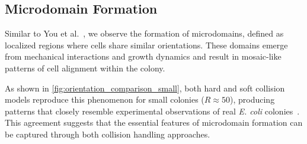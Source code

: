 \documentclass[conference]{IEEEtran}
\begin{document}
\subsection{Microdomain Formation}
\label{sec:microdomain_formation}

Similar to You et al.~\cite{You2018,You_2021}, we observe the formation of microdomains, defined as localized regions where cells share similar orientations. These domains emerge from mechanical interactions and growth dynamics and result in mosaic-like patterns of cell alignment within the colony.

As shown in \autoref{fig:orientation_comparison_small}, both hard and soft collision models reproduce this phenomenon for small colonies ($R \approx 50$), producing patterns that closely resemble experimental observations of real \textit{E. coli} colonies~\cite{You2018}. This agreement suggests that the essential features of microdomain formation can be captured through both collision handling approaches.
\end{document}
